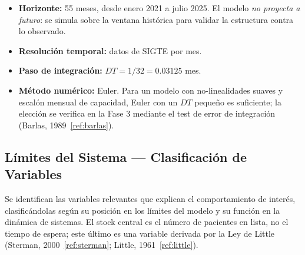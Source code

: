 \documentclass[12pt,a4paper]{article}
\begin{document}
\begin{itemize}[leftmargin=1.5cm]
  \item \textbf{Horizonte:} 55 meses, desde enero 2021 a julio 2025. El modelo \emph{no proyecta a futuro}: se simula sobre la ventana histórica para validar la estructura contra lo observado.
  \item \textbf{Resolución temporal:} datos de SIGTE por mes.
  \item \textbf{Paso de integración:} $DT = 1/32 = 0.03125$ mes.
  \item \textbf{Método numérico:} Euler. Para un modelo con no-linealidades suaves y escalón mensual de capacidad, Euler con un $DT$ pequeño es suficiente; la elección se verifica en la Fase 3 mediante el test de error de integración (Barlas, 1989~\ref{ref:barlas}).
\end{itemize}

\subsection{Límites del Sistema — Clasificación de Variables}

Se identifican las variables relevantes que explican el comportamiento de interés, clasificándolas según su posición en los límites del modelo y su función en la dinámica de sistemas. El stock central es el número de pacientes en lista, no el tiempo de espera; este último es una variable derivada por la Ley de Little (Sterman, 2000~\ref{ref:sterman}; Little, 1961~\ref{ref:little}).
\end{document}
